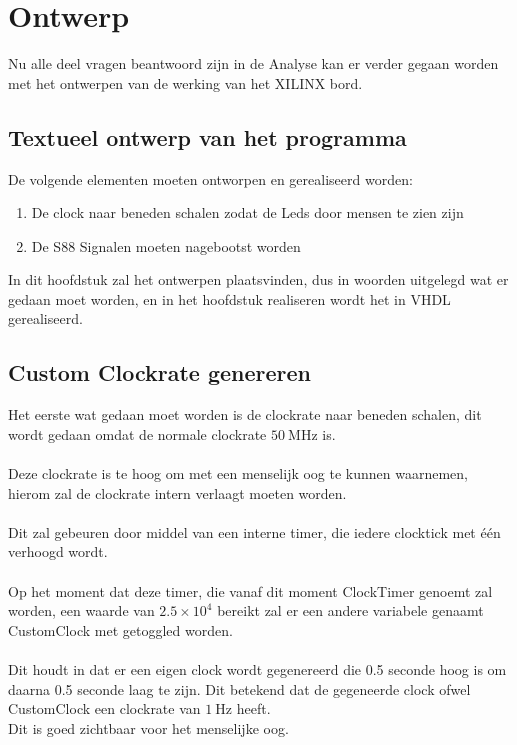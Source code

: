 \chapter{Ontwerp}

Nu alle deel vragen beantwoord zijn in de Analyse kan er verder gegaan worden met het ontwerpen van de werking van het XILINX bord.

\section{Textueel ontwerp van het programma}

De volgende elementen moeten ontworpen en gerealiseerd worden:
\begin{enumerate}
	\item De clock naar beneden schalen zodat de Leds door mensen te zien zijn
	\item De S88 Signalen moeten nagebootst worden
\end{enumerate}

In dit hoofdstuk zal het ontwerpen plaatsvinden, dus in woorden uitgelegd wat er gedaan moet worden, en in het hoofdstuk realiseren wordt het in VHDL gerealiseerd.

\clearpage
\section{Custom Clockrate genereren}

Het eerste wat gedaan moet worden is de clockrate naar beneden schalen, dit wordt gedaan omdat de normale clockrate $\SI{50}{\mega\hertz} $ is.
\\\\
Deze clockrate is te hoog om met een menselijk oog te kunnen waarnemen, hierom zal de clockrate intern verlaagt moeten worden.
\\\\
Dit zal gebeuren door middel van een interne timer, die iedere clocktick met één verhoogd wordt.
\\\\
Op het moment dat deze timer, die vanaf dit moment ClockTimer genoemt zal worden, een waarde van ${2.5} \times {10}^4$ bereikt zal er een andere variabele genaamt CustomClock met getoggled worden.
\\\\
Dit houdt in dat er een eigen clock wordt gegenereerd die 0.5 seconde hoog is om daarna 0.5 seconde laag te zijn. Dit betekend dat de gegeneerde clock ofwel CustomClock een clockrate van $\SI{1}{\hertz}$ heeft. 
\\
Dit is goed zichtbaar voor het menselijke oog.
\clearpage
